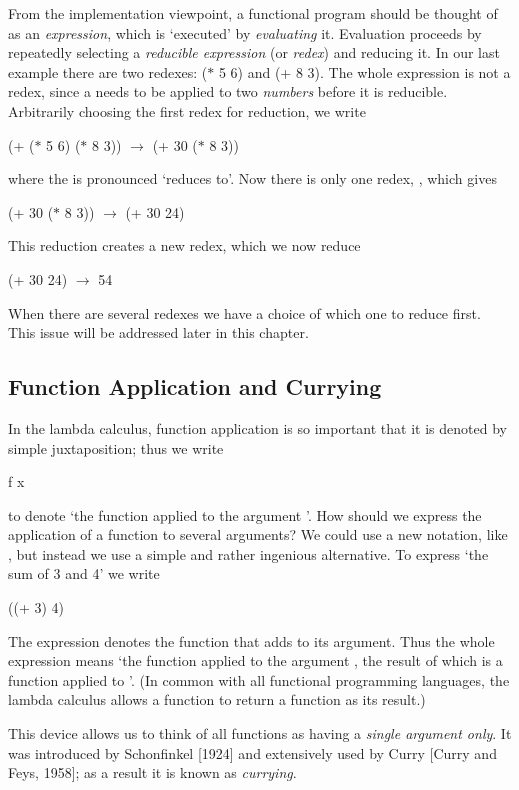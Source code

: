 From the implementation viewpoint, a functional program should be
thought of as an \textit{expression}, which is `executed' by \textit{evaluating} it. Evaluation
proceeds by repeatedly selecting a \textit{reducible expression} (or \textit{redex}) and
reducing it. In our last example there are two redexes: ($*$ 5 6) and (+ 8 3).
The whole expression  is not a redex, since a \ml{+} needs to be
applied to two \textit{numbers} before it is reducible. Arbitrarily choosing the first
redex for reduction, we write
\begin{mlcoded}
(+ ($*$ 5 6) ($*$ 8 3)) $\to$ (+ 30 ($*$ 8 3))
\end{mlcoded}
where the \ml{$\to$} is pronounced `reduces to'. Now there is only one redex, ,
which gives
\begin{mlcoded}
(+ 30 ($*$ 8 3)) $\to$ (+ 30 24)
\end{mlcoded}
This reduction creates a new redex, which we now reduce
\begin{mlcoded}
(+ 30 24) $\to$ 54
\end{mlcoded}
\indent When there are several redexes we have a choice of which one to reduce
first. This issue will be addressed later in this chapter.

\subsection{Function Application and Currying}
In the lambda calculus, function application is so important that it is denoted
by simple juxtaposition; thus we write
\begin{mlcoded}
f x
\end{mlcoded}
to denote `the function  applied to the argument '. How should we express
the application of a function to several arguments? We could use a new
notation, like , but instead we use a simple and rather ingenious
alternative. To express `the sum of 3 and 4' we write
\begin{mlcoded}
	((+ 3) 4)
\end{mlcoded}
The expression  denotes the function that adds  to its argument. Thus
the whole expression means `the function \ml{+} applied to the argument , the
result of which is a function applied to '. (In common with all functional
programming languages, the lambda calculus allows a function to return a
function as its result.)

This device allows us to think of all functions as having a \textit{single argument
only}. It was introduced by Schonfinkel [1924] and extensively used by Curry
[Curry and Feys, 1958]; as a result it is known as \textit{currying}.

